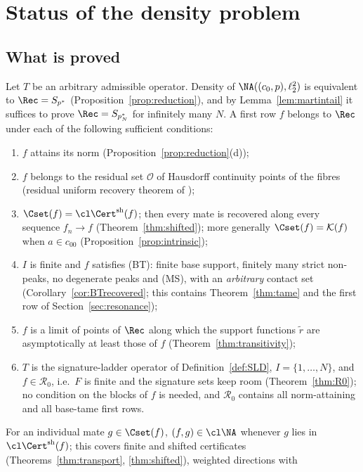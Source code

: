 \section{Status of the density problem}\label{sec:status}

\subsection{What is proved}
Let $T$ be an arbitrary admissible operator.  Density of
$\NA((c_0,p),\ell_2^2)$ is equivalent to $\Rec=S_{p^*}$
(Proposition~\ref{prop:reduction}), and by Lemma~\ref{lem:martintail} it
suffices to prove $\Rec=S_{p_N^*}$ for infinitely many $N$.  A first row
$f$ belongs to $\Rec$ under each of the following sufficient conditions:
\begin{enumerate}
\item[(S1)] $f$ attains its norm (Proposition~\ref{prop:reduction}(d));
\item[(S2)] $f$ belongs to the residual set $\mathcal O$ of Hausdorff continuity
points of the fibres (residual uniform recovery theorem of \cite{PrA});
\item[(S3)] $\Cset(f)=\cl\Cert^{\rm sh}(f)$; then every mate is recovered
along every sequence $f_n\to f$ (Theorem~\ref{thm:shifted}); more generally
$\Cset(f)=\mathcal K(f)$ when $a\in c_{00}$ (Proposition~\ref{prop:intrinsic});
\item[(S4)] $I$ is finite and $f$ satisfies \textup{(BT)}: finite base support,
finitely many strict non-peaks, no degenerate peaks and \textup{(MS)}, with
an \emph{arbitrary} contact set (Corollary~\ref{cor:BTrecovered}; this
contains Theorem~\ref{thm:tame} and the first row of
Section~\ref{sec:resonance});
\item[(S5)] $f$ is a limit of points of $\Rec$ along which the support
functions $\tilde r$ are asymptotically at least those of $f$
(Theorem~\ref{thm:transitivity});
\item[(S6)] $T$ is the signature-ladder operator of
Definition~\ref{def:SLD}, $I=\{1,\dots,N\}$, and $f\in\mathcal R_0$, i.e.\
$F$ is finite and the signature sets keep room (Theorem~\ref{thm:R0}); no
condition on the blocks of $f$ is needed, and $\mathcal R_0$ contains all
norm-attaining and all base-tame first rows.
\end{enumerate}
For an individual mate $g\in\Cset(f)$, $(f,g)\in\cl\NA$ whenever $g$ lies
in $\cl\Cert^{\rm sh}(f)$; this covers finite and shifted certificates
(Theorems~\ref{thm:transport}, \ref{thm:shifted}), weighted directions with
